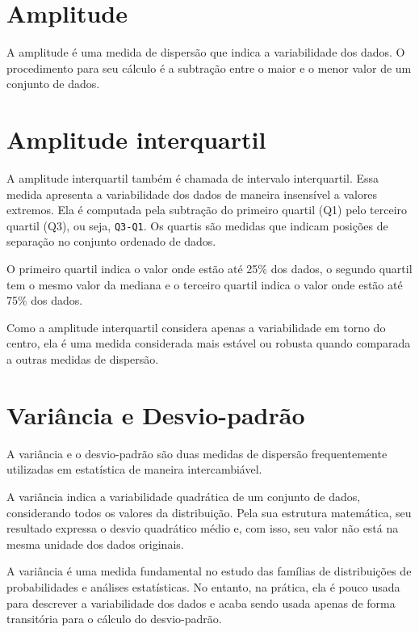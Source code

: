 \documentclass[
]{book}
\begin{document}
\hypertarget{amplitude}{%
\section{Amplitude}\label{amplitude}}

A amplitude é uma medida de dispersão que indica a variabilidade dos dados. O procedimento para seu cálculo é a subtração entre o maior e o menor valor de um conjunto de dados.

\hypertarget{amplitude-interquartil}{%
\section{Amplitude interquartil}\label{amplitude-interquartil}}

A amplitude interquartil também é chamada de intervalo interquartil. Essa medida apresenta a variabilidade dos dados de maneira insensível a valores extremos. Ela é computada pela subtração do primeiro quartil (Q1) pelo terceiro quartil (Q3), ou seja, \texttt{Q3-Q1}. Os quartis são medidas que indicam posições de separação no conjunto ordenado de dados.

O primeiro quartil indica o valor onde estão até 25\% dos dados, o segundo quartil tem o mesmo valor da mediana e o terceiro quartil indica o valor onde estão até 75\% dos dados.

Como a amplitude interquartil considera apenas a variabilidade em torno do centro, ela é uma medida considerada mais estável ou robusta quando comparada a outras medidas de dispersão.

\hypertarget{variuxe2ncia-e-desvio-padruxe3o}{%
\section{Variância e Desvio-padrão}\label{variuxe2ncia-e-desvio-padruxe3o}}

A variância e o desvio-padrão são duas medidas de dispersão frequentemente utilizadas em estatística de maneira intercambiável.

A variância indica a variabilidade quadrática de um conjunto de dados, considerando todos os valores da distribuição. Pela sua estrutura matemática, seu resultado expressa o desvio quadrático médio e, com isso, seu valor não está na mesma unidade dos dados originais.

A variância é uma medida fundamental no estudo das famílias de distribuições de probabilidades e análises estatísticas. No entanto, na prática, ela é pouco usada para descrever a variabilidade dos dados e acaba sendo usada apenas de forma transitória para o cálculo do desvio-padrão.
\end{document}
